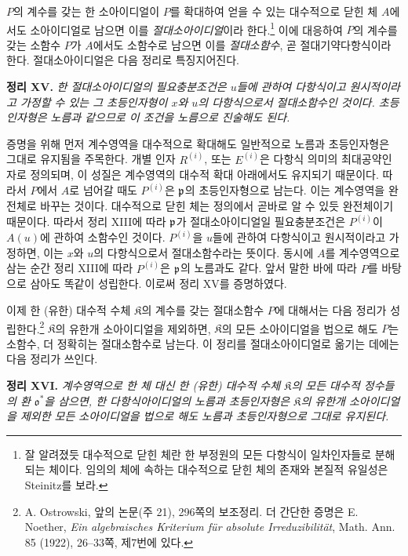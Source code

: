 \(P\)의 계수를 갖는 한 소아이디얼이 \(P\)를 확대하여 얻을 수 있는 대수적으로 닫힌 체 \(A\)에서도 소아이디얼로 남으면 이를 \emph{절대소아이디얼}이라 한다.\footnote{잘 알려졌듯 대수적으로 닫힌 체란 한 부정원의 모든 다항식이 일차인자들로 분해되는 체이다. 임의의 체에 속하는 대수적으로 닫힌 체의 존재와 본질적 유일성은 Steinitz를 보라.} 이에 대응하여 \(P\)의 계수를 갖는 소함수 \(P\)가 \(A\)에서도 소함수로 남으면 이를 \emph{절대소함수}, 곧 절대기약다항식이라 한다. 절대소아이디얼은 다음 정리로 특징지어진다.

\textbf{정리 XV.} \emph{한 절대소아이디얼의 필요충분조건은 \(u\)들에 관하여 다항식이고 원시적이라고 가정할 수 있는 그 초등인자형이 \(x\)와 \(u\)의 다항식으로서 절대소함수인 것이다. 초등인자형은 노름과 같으므로 이 조건을 노름으로 진술해도 된다.}

증명을 위해 먼저 계수영역을 대수적으로 확대해도 일반적으로 노름과 초등인자형은 그대로 유지됨을 주목한다. 개별 인자 \(R^{(i)}\), 또는 \(E^{(i)}\)은 다항식 의미의 최대공약인자로 정의되며, 이 성질은 계수영역의 대수적 확대 아래에서도 유지되기 때문이다. 따라서 \(P\)에서 \(A\)로 넘어갈 때도 \(P^{(i)}\)은 \(\mathfrak p\)의 초등인자형으로 남는다. 이는 계수영역을 완전체로 바꾸는 것이다. 대수적으로 닫힌 체는 정의에서 곧바로 알 수 있듯 완전체이기 때문이다. 따라서 정리 XIII에 따라 \(\mathfrak p\)가 절대소아이디얼일 필요충분조건은 \(P^{(i)}\)이 \(A(u)\)에 관하여 소함수인 것이다. \(P^{(i)}\)을 \(u\)들에 관하여 다항식이고 원시적이라고 가정하면, 이는 \(x\)와 \(u\)의 다항식으로서 절대소함수라는 뜻이다. 동시에 \(A\)를 계수영역으로 삼는 순간 정리 XIII에 따라 \(P^{(i)}\)은 \(\mathfrak p\)의 노름과도 같다. 앞서 말한 바에 따라 \(P\)를 바탕으로 삼아도 똑같이 성립한다. 이로써 정리 XV를 증명하였다.

이제 한 (유한) 대수적 수체 \(\mathfrak K\)의 계수를 갖는 절대소함수 \(P\)에 대해서는 다음 정리가 성립한다.\footnote{A. Ostrowski, 앞의 논문(주 21), 296쪽의 보조정리. 더 간단한 증명은 E. Noether, \emph{Ein algebraisches Kriterium für absolute Irreduzibilität}, Math. Ann. 85 (1922), 26--33쪽, 제7번에 있다.} \(\mathfrak K\)의 유한개 소아이디얼을 제외하면, \(\mathfrak K\)의 모든 소아이디얼을 법으로 해도 \(P\)는 소함수, 더 정확히는 절대소함수로 남는다. 이 정리를 절대소아이디얼로 옮기는 데에는 다음 정리가 쓰인다.

\textbf{정리 XVI.} \emph{계수영역으로 한 체 대신 한 (유한) 대수적 수체 \(\mathfrak K\)의 모든 대수적 정수들의 환 \(\mathfrak o^*\)을 삼으면, 한 다항식아이디얼의 노름과 초등인자형은 \(\mathfrak K\)의 유한개 소아이디얼을 제외한 모든 소아이디얼을 법으로 해도 노름과 초등인자형으로 그대로 유지된다.}

